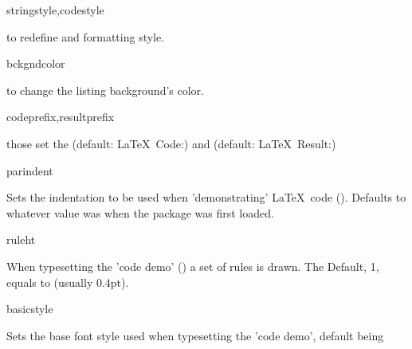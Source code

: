 \documentclass{article}
\begin{document}
\begin{codedescribe}[key]{stringstyle,codestyle}
\begin{codesyntax} %
\end{codesyntax}
to redefine  and  formatting style.\\
\end{codedescribe}

\begin{codedescribe}[key]{bckgndcolor}
\begin{codesyntax} %
\end{codesyntax}
to change the listing background's color.\\
\end{codedescribe}

\begin{codedescribe}[key]{codeprefix,resultprefix}
\begin{codesyntax} %
\end{codesyntax}
those set the  (default: \LaTeX~Code:) and  (default: \LaTeX~Result:)
\end{codedescribe}

\begin{codedescribe}[key]{parindent}
\begin{codesyntax} %
\end{codesyntax}
Sets the indentation to be used when 'demonstrating' \LaTeX\ code (\tsobj[code]{\tsdemo}). Defaults to whatever value \tsobj[code]{\parindent} was when the package was first loaded.
\end{codedescribe}

\begin{codedescribe}[key]{ruleht}%
\begin{codesyntax} %
\end{codesyntax}
When typesetting the 'code demo' (\tsobj{\tsdemo}) a set of rules is drawn. The Default, 1, equals to \tsobj{\arrayrulewidth} (usually 0.4pt).
\end{codedescribe}

\begin{codedescribe}[key,new=2023/11/18]{basicstyle}%
\begin{codesyntax} %
\end{codesyntax}
Sets the base font style used when typesetting the 'code demo', default being \tsobj{\footnotesize\ttfamily}
\end{codedescribe}
\end{document}
